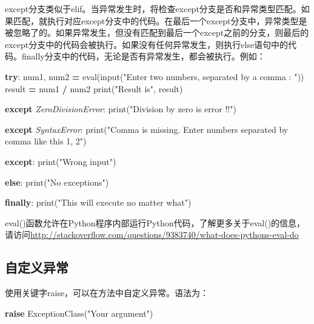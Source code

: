 \documentclass[]{ctexbook}
\newenvironment{Shaded}{\begin{snugshade}}{\end{snugshade}}
\newcommand{\BuiltInTok}[1]{#1}
\newcommand{\ControlFlowTok}[1]{\textcolor[rgb]{0.13,0.29,0.53}{\textbf{#1}}}
\newcommand{\NormalTok}[1]{#1}
\newcommand{\OperatorTok}[1]{\textcolor[rgb]{0.81,0.36,0.00}{\textbf{#1}}}
\newcommand{\PreprocessorTok}[1]{\textcolor[rgb]{0.56,0.35,0.01}{\textit{#1}}}
\newcommand{\StringTok}[1]{\textcolor[rgb]{0.31,0.60,0.02}{#1}}
\begin{document}
except分支类似于elif。当异常发生时，将检查except分支是否和异常类型匹配。如果匹配，就执行对应except分支中的代码。在最后一个except分支中，异常类型是被忽略了的。如果异常发生，但没有匹配到最后一个except之前的分支，则最后的except分支中的代码会被执行。如果没有任何异常发生，则执行else语句中的代码。finally分支中的代码，无论是否有异常发生，都会被执行。例如：

\begin{Shaded}
\begin{Highlighting}[]
\ControlFlowTok{try}\NormalTok{:}
\NormalTok{    num1, num2 }\OperatorTok{=} \BuiltInTok{eval}\NormalTok{(}\BuiltInTok{input}\NormalTok{(}\StringTok{"Enter two numbers, separated by a comma : "}\NormalTok{))}
\NormalTok{    result }\OperatorTok{=}\NormalTok{ num1 }\OperatorTok{/}\NormalTok{ num2}
    \BuiltInTok{print}\NormalTok{(}\StringTok{"Result is"}\NormalTok{, result)}

\ControlFlowTok{except} \PreprocessorTok{ZeroDivisionError}\NormalTok{:}
    \BuiltInTok{print}\NormalTok{(}\StringTok{"Division by zero is error !!"}\NormalTok{)}

\ControlFlowTok{except} \PreprocessorTok{SyntaxError}\NormalTok{:}
    \BuiltInTok{print}\NormalTok{(}\StringTok{"Comma is missing. Enter numbers separated by comma like this 1, 2"}\NormalTok{)}

\ControlFlowTok{except}\NormalTok{:}
    \BuiltInTok{print}\NormalTok{(}\StringTok{"Wrong input"}\NormalTok{)}

\ControlFlowTok{else}\NormalTok{:}
    \BuiltInTok{print}\NormalTok{(}\StringTok{"No exceptions"}\NormalTok{)}

\ControlFlowTok{finally}\NormalTok{:}
    \BuiltInTok{print}\NormalTok{(}\StringTok{"This will execute no matter what"}\NormalTok{)}
\end{Highlighting}
\end{Shaded}

eval()函数允许在Python程序内部运行Python代码，了解更多关于eval()的信息，请访问\url{http://stackoverflow.com/questions/9383740/what-does-pythons-eval-do}

\hypertarget{ux81eaux5b9aux4e49ux5f02ux5e38}{%
\subsection{自定义异常}\label{ux81eaux5b9aux4e49ux5f02ux5e38}}

使用关键字raise，可以在方法中自定义异常。语法为：

\begin{Shaded}
\begin{Highlighting}[]
\ControlFlowTok{raise}\NormalTok{ ExceptionClass(}\StringTok{"Your argument"}\NormalTok{)}
\end{Highlighting}
\end{Shaded}
\end{document}
